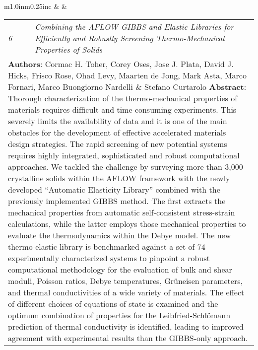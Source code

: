 \documentclass[11pt]{article}
\begin{document}
\begin{tabular}{m{1.0in}m{0.25in}c}
 & & 
\begin{tabular}{m{0.3in}m{0.15in}m{4.3in}}
\textit{\small{6}} & & \textit{Combining the {\small AFLOW} {\small GIBBS} and Elastic Libraries for Efficiently and Robustly Screening Thermo-Mechanical Properties of Solids} \\ \multicolumn{3}{p{4.75in}}{\footnotesize{\textbf{Authors}: Cormac H. Toher, \textcolor{NavyBlue}{Corey Oses}, Jose J. Plata, David J. Hicks, Frisco Rose, Ohad Levy, Maarten de Jong, Mark Asta, Marco Fornari, Marco Buongiorno Nardelli \& Stefano Curtarolo \newline \textbf{Abstract}: Thorough characterization of the thermo-mechanical properties of materials requires difficult and time-consuming experiments. This severely limits the availability of data and it is one of the main obstacles for the development of effective accelerated materials design strategies. The rapid screening of new potential systems requires highly integrated, sophisticated and robust computational approaches. We tackled the challenge by surveying more than 3,000 crystalline solids within the {\small AFLOW} framework with the newly developed ``Automatic Elasticity Library'' combined with the previously implemented {\small GIBBS} method. The first extracts the mechanical properties from automatic self-consistent stress-strain calculations, while the latter employs those mechanical properties to evaluate the thermodynamics within the Debye model. The new thermo-elastic library is benchmarked against a set of 74 experimentally characterized systems to pinpoint a robust computational methodology for the evaluation of bulk and shear moduli, Poisson ratios, Debye temperatures, Gr{\"u}neisen parameters, and thermal conductivities of a wide variety of materials. The effect of different choices of equations of state is examined and the optimum combination of properties for the Leibfried-Schl{\"o}mann prediction of thermal conductivity is identified, leading to improved agreement with experimental results than the {\small GIBBS}-only approach.}} 
\end{tabular} \\ 
\end{tabular}

\vspace{0.25cm}
\end{document}
